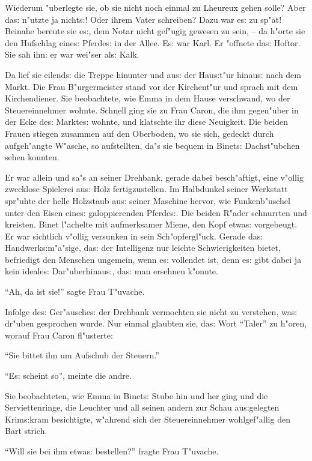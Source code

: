 \documentclass[oneside,12pt]{book}
\newcommand{\s}{s:}%
\begin{document}
Wiederum "uberlegte sie, ob sie nicht noch einmal zu Lheureux
gehen solle? Aber da{\s} n"utzte ja nicht{\s}! Oder ihrem Vater
schreiben? Dazu war e{\s} zu sp"at! Beinahe bereute sie e{\s}, dem
Notar nicht gef"ugig gewesen zu sein, -- da h"orte sie den
Hufschlag eine{\s} Pferde{\s} in der Allee. E{\s} war Karl. Er
"offnete da{\s} Hoftor. Sie sah ihn: er war wei"ser al{\s} Kalk.

Da lief sie eilend{\s} die Treppe hinunter und au{\s} der
Hau{\s}t"ur hinau{\s} nach dem Markt. Die Frau B"urgermeister
stand vor der Kirchent"ur und sprach mit dem Kirchendiener. Sie
beobachtete, wie Emma in dem Hause verschwand, wo der
Steuereinnehmer wohnte. Schnell ging sie zu Frau Caron, die
ihm gegen"uber in der Ecke de{\s} Markte{\s} wohnte, und klatschte
ihr diese Neuigkeit. Die beiden Frauen stiegen zusammen auf den
Oberboden, wo sie sich, gedeckt durch aufgeh"angte W"asche, so
aufstellten, da"s sie bequem in Binet{\s} Dachst"ubchen sehen
konnten.

Er war allein und sa"s an seiner Drehbank, gerade dabei
besch"aftigt, eine v"ollig zwecklose Spielerei au{\s} Holz
fertigzustellen. Im Halbdunkel seiner Werkstatt spr"uhte der helle
Holzstaub au{\s} seiner Maschine hervor, wie Funkenb"uschel unter
den Eisen eine{\s} galoppierenden Pferde{\s}. Die beiden R"ader
schnurrten und kreisten. Binet l"achelte mit aufmerksamer Miene,
den Kopf etwa{\s} vorgebeugt. Er war sichtlich v"ollig versunken
in sein Sch"opfergl"uck. Gerade da{\s} Handwerk{\s}m"a"sige,
da{\s} der Intelligenz nur leichte Schwierigkeiten bietet,
befriedigt den Menschen ungemein, wenn e{\s} vollendet ist, denn
e{\s} gibt dabei ja kein ideale{\s} Dar"uberhinau{\s}, da{\s} man
ersehnen k"onnte.

"`Ah, da ist sie!"' sagte Frau T"uvache.

Infolge de{\s} Ger"ausche{\s} der Drehbank vermochten sie nicht zu
verstehen, wa{\s} dr"uben gesprochen wurde. Nur einmal glaubten
sie, da{\s} Wort "`Taler"' zu h"oren, worauf Frau Caron
fl"usterte:

"`Sie bittet ihn um Aufschub der Steuern."'

"`E{\s} scheint so"', meinte die andre.

Sie beobachteten, wie Emma in Binet{\s} Stube hin und her ging und
die Serviettenringe, die Leuchter und all seinen andern zur Schau
au{\s}gelegten Krim{\s}kram besichtigte, w"ahrend sich der
Steuereinnehmer wohlgef"allig den Bart strich.

"`Will sie bei ihm etwa{\s} bestellen?"' fragte Frau T"uvache.
\end{document}
